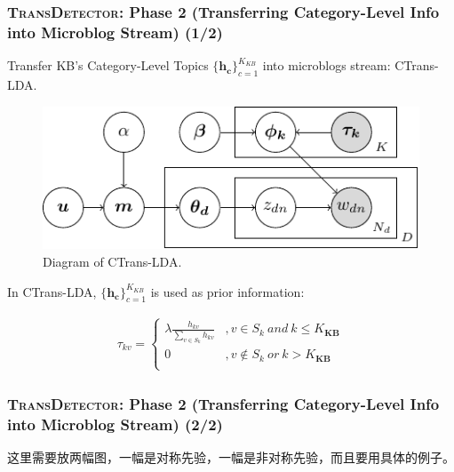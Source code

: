 \begin{frame}
\frametitle{\textsc{TransDetector}: Phase 2 (Transferring Category-Level Info into Microblog Stream) (1/2)}	
Transfer KB's Category-Level Topics \(\{\bm{h_c}\}_{c=1}^{K_{KB}}\) into microblogs stream: CTrans-LDA.
\begin{figure}[h]
		\setlength{\abovecaptionskip}{0.cm}
        \setlength{\belowcaptionskip}{0.cm}
        \centering
        \includegraphics[width=0.6\columnwidth]{img/lda_tikz.pdf}
        \caption{Diagram of CTrans-LDA.}
        \label{fig:hood}
\end{figure}

In CTrans-LDA, \(\{\bm{h_c}\}_{c=1}^{K_{KB}}\) is used as prior information:
\setlength{\abovedisplayskip}{0pt}
\setlength{\belowdisplayskip}{0pt}
\begin{scriptsize}
\begin{equation}
\label{eq:wikiPrior}
\begin{aligned}
\tau_{kv}=
\left\{ \begin{aligned}
\lambda \frac{h_{kv}}{\sum_{v\in S_{k}}h_{kv}} &,v\in S_{k}\ and  \ k \leq K_{\bm{KB}} \\
0&,v \notin S_{k} \ or \ k > K_{\bm{KB}} \\
\end{aligned}\right.
\end{aligned}
\end{equation}
\end{scriptsize}
\end{frame}

\begin{frame}
\frametitle{\textsc{TransDetector}: Phase 2 (Transferring Category-Level Info into Microblog Stream) (2/2)}	

这里需要放两幅图，一幅是对称先验，一幅是非对称先验，而且要用具体的例子。


\end{frame}


